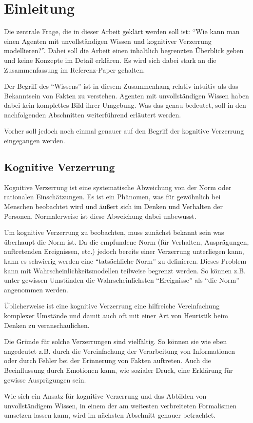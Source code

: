 \chapter{Einleitung}
\label{introduction}
Die zentrale Frage, die in dieser Arbeit geklärt werden soll ist: \enquote{Wie kann man einen Agenten mit unvollständigen Wissen und kognitiver Verzerrung modellieren?}. 
Dabei soll die Arbeit einen inhaltlich begrenzten Überblick geben und keine Konzepte im Detail erklären. Es wird sich dabei stark an die Zusammenfassung im Referenz-Paper \cite{balke2014agents} gehalten.

Der Begriff des \enquote{Wissens} ist in diesem Zusammenhang relativ intuitiv als das Bekanntsein von Fakten zu verstehen.
Agenten mit unvollständigen Wissen haben dabei kein komplettes Bild ihrer Umgebung.
Was das genau bedeutet, soll in den nachfolgenden Abschnitten weiterführend erläutert werden.

Vorher soll jedoch noch einmal genauer auf den Begriff der kognitive Verzerrung eingegangen werden.

\section{Kognitive Verzerrung}
Kognitive Verzerrung ist eine systematische Abweichung von der Norm oder rationalen Einschätzungen\cite{}. 
Es ist ein Phänomen, was für gewöhnlich bei Menschen beobachtet wird und äußert sich im Denken und Verhalten der Personen.
Normalerweise ist diese Abweichung dabei unbewusst.

Um kognitive Verzerrung zu beobachten, muss zunächst bekannt sein was überhaupt die Norm ist.
Da die empfundene Norm (für Verhalten, Ausprägungen, auftretenden Ereignissen, etc.) jedoch bereits einer Verzerrung unterliegen kann, kann es schwierig werden eine \enquote{tatsächliche Norm} zu definieren. 
Dieses Problem kann mit Wahrscheinlichkeitsmodellen teilweise begrenzt werden. 
So können z.B. unter gewissen Umständen die Wahrscheinlichsten \enquote{Ereignisse} als \enquote{die Norm} angenommen werden.

Üblicherweise ist eine kognitive Verzerrung eine hilfreiche Vereinfachung komplexer Umstände und damit auch oft mit einer Art von Heuristik beim Denken zu veranschaulichen.

Die Gründe für solche Verzerrungen sind vielfältig.
So können sie wie eben angedeutet z.B. durch die Vereinfachung der Verarbeitung von Informationen oder durch Fehler bei der Erinnerung von Fakten auftreten.
Auch die Beeinflussung durch Emotionen kann, wie sozialer Druck, eine Erklärung für gewisse Ausprägungen sein.

Wie sich ein Ansatz für kognitive Verzerrung und das Abbilden von unvollständigem Wissen, in einem der am weitesten verbreiteten Formalismen umsetzen lassen kann, wird im nächsten Abschnitt genauer betrachtet.